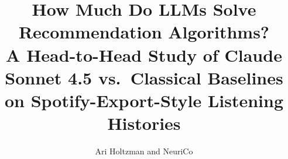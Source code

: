 \documentclass{article}
\title{How Much Do LLMs Solve Recommendation Algorithms?\\
A Head-to-Head Study of Claude Sonnet 4.5 vs.\ Classical Baselines on Spotify-Export-Style Listening Histories}
\author{Ari Holtzman and NeuriCo}
\begin{document}
\maketitle

\begin{abstract}

\end{abstract}









\end{document}
